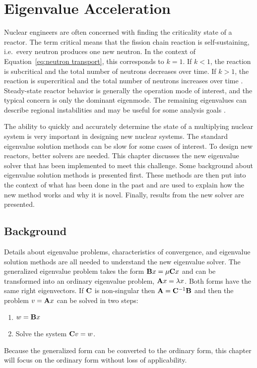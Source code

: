 
\chapter{Eigenvalue Acceleration}
\label{sec:Chp3}
Nuclear engineers are often concerned with finding the criticality state of a reactor. The term critical means that the fission chain reaction is self-sustaining, i.e.\ every neutron produces one new neutron. In the context of Equation~\ref{eq:neutron transport}, this corresponds to $k = 1$. If $k < 1$, the reaction is subcritical and the total number of neutrons decreases over time. If $k > 1$, the reaction is supercritical and the total number of neutrons increases over time \cite{Duderstadt1976}. Steady-state reactor behavior is generally the operation mode of interest, and the typical concern is only the dominant eigenmode. The remaining eigenvalues can describe regional instabilities and may be useful for some analysis goals \cite{Vidal1998}. 

The ability to quickly and accurately determine the state of a multiplying nuclear system is very important in designing new nuclear systems. The standard eigenvalue solution methods can be slow for some cases of interest. To design new reactors, better solvers are needed. This chapter discusses the new eigenvalue solver that has been implemented to meet this challenge. Some background about eigenvalue solution methods is presented first. These methods are then put into the context of what has been done in the past and are used to explain how the new method works and why it is novel. Finally, results from the new solver are presented.

\section{Background}
Details about eigenvalue problems, characteristics of convergence, and eigenvalue solution methods are all needed to understand the new eigenvalue solver. The generalized eigenvalue problem takes the form $\mathbf{B}x = \mu \mathbf{C}x$ and can be transformed into an ordinary eigenvalue problem, $\mathbf{A}x = \lambda x$. Both forms have the same right eigenvectors. If $\mathbf{C}$ is non-singular then $\mathbf{A} = \mathbf{C}^{-1}\mathbf{B}$ and then the problem $v = \mathbf{A}x$ can be solved in two steps: \cite{Stewart2001}
%
\begin{enumerate}
  \item $w = \mathbf{B}x$
  \item Solve the system $\mathbf{C}v = w$.
\end{enumerate}
%
Because the generalized form can be converted to the ordinary form, this chapter will focus on the ordinary form without loss of applicability.

